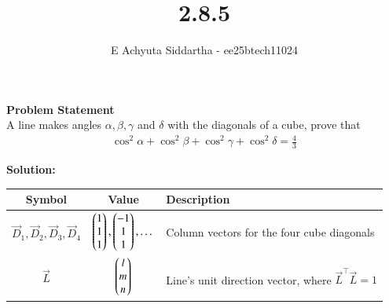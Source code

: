 \documentclass[journal]{IEEEtran}
\title{2.8.5}
\author{E Achyuta Siddartha - ee25btech11024}
\begin{document}
\maketitle

\noindent
\textbf{Problem Statement} \\
A line makes angles $\alpha, \beta, \gamma$ and $\delta$ with the diagonals of a cube, prove that
\begin{align}
\cos^2\alpha + \cos^2\beta + \cos^2\gamma + \cos^2\delta = \frac{4}{3}
\end{align}

\vspace{1.5em}

\noindent
\textbf{Solution:}\\

\begin{center}
    \begin{tabular}{|c|c|p{5cm}|}
    \hline
    \textbf{Symbol} & \textbf{Value} & \textbf{Description}  \\
    \hline
    \textbf{$\vec{D}_1, \vec{D}_2, \vec{D}_3, \vec{D}_4$} & $\begin{pmatrix}1\\1\\1\end{pmatrix}, \begin{pmatrix}-1\\1\\1\end{pmatrix}, \dots$ & Column vectors for the four cube diagonals \\
    \hline
    \textbf{$\vec{L}$} & $\begin{pmatrix}l \\ m \\ n\end{pmatrix}$ & Line's unit direction vector, where $\vec{L}^\top\vec{L} = 1$ \\
    \hline
    \end{tabular}
\end{center}
\noindent
\end{document}
